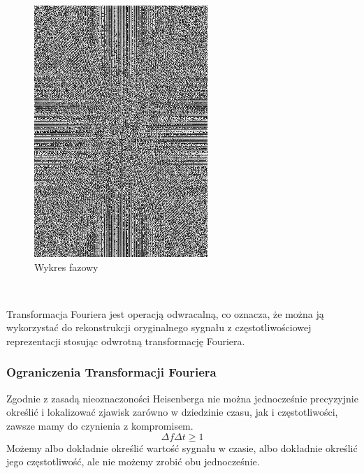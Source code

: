\begin{figure}[ht]
\begin{minipage}[t]{0.325\linewidth}
        \includegraphics[width=\linewidth]{Rozdziały/02.Podstawy_teoretyczne/Obrazy/fft_phase.png}
        \caption{Wykres fazowy}
        \label{fig:image26}
    \end{minipage}
\end{figure}\

Transformacja Fouriera jest operacją odwracalną, co oznacza, że można ją wykorzystać do rekonstrukcji oryginalnego sygnału z częstotliwościowej reprezentacji stosując odwrotną transformację Fouriera.


\subsubsection{Ograniczenia Transformacji Fouriera}

Zgodnie z zasadą nieoznaczoności Heisenberga nie można jednocześnie precyzyjnie określić i lokalizować zjawisk zarówno w dziedzinie czasu, jak i częstotliwości, zawsze mamy do czynienia z kompromisem. 
\begin{equation*}
    \Delta f \Delta t \geq 1
\end{equation*}
Możemy albo dokładnie określić wartość sygnału w czasie, albo dokładnie określić jego częstotliwość, ale nie możemy zrobić obu jednocześnie.

